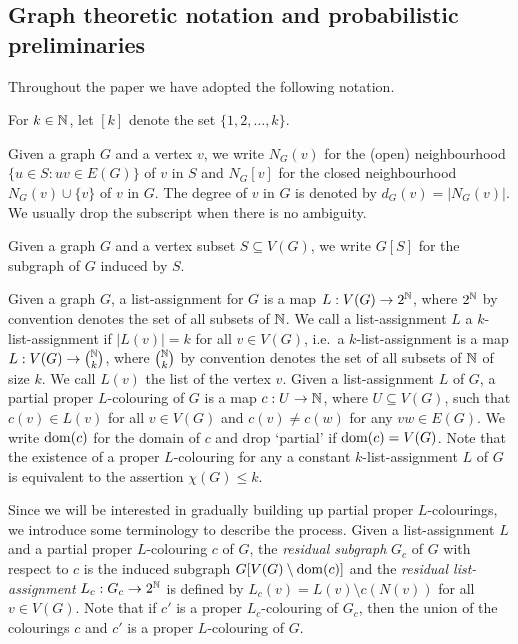 
\subsection{Graph theoretic notation and probabilistic preliminaries}
\label{sub:prelim}
\label{sub:notation}


Throughout the paper we have adopted the following notation. 

For $k\in \mathbb{N}$, let $[k]$ denote the set $\{1,2,\dots,k\}$.

Given a graph $G$ and a vertex $v$, we write $N_G(v)$ for the (open) neighbourhood $\{u\in S:uv\in E(G)\}$ of $v$ in $S$ and $N_G[v]$ for the closed neighbourhood $N_G(v)\cup \{v\}$ of $v$ in $G$. 
The degree of $v$ in $G$ is denoted by $d_G(v)=|N_G(v)|$.
We usually drop the subscript when there is no ambiguity.

Given a graph $G$ and a vertex subset $S\subseteq V(G)$, we write $G[S]$ for the subgraph of $G$ induced by $S$.

Given a graph $G$, a list-assignment for $G$ is a map $L:V(G)\to 2^{\mathbb{N}}$, where $2^{\mathbb{N}}$ by convention denotes the set of all subsets of $\mathbb{N}$. We call a list-assignment $L$ a $k$-list-assignment if $|L(v)|=k$ for all $v\in V(G)$, i.e.~a $k$-list-assignment is a map $L:V(G)\to \binom{\mathbb{N}}{k}$, where $\binom{\mathbb{N}}{k}$ by convention denotes the set of all subsets of $\mathbb{N}$ of size $k$.
We call $L(v)$ the list of the vertex $v$. 
Given a list-assignment $L$ of $G$, a partial proper $L$-colouring of $G$ is a map $c:U\to \mathbb{N}$, where $U\subseteq V(G)$, such that $c(v)\in L(v)$ for all $v\in V(G)$ and $c(v)\neq c(w)$ for any $vw\in E(G)$.
We write $\operatorname{dom}(c)$ for the domain of $c$ and drop `partial' if $\operatorname{dom}(c)=V(G)$.
Note that the existence of a proper $L$-colouring for any a constant $k$-list-assignment $L$ of $G$ is equivalent to the assertion $\chi(G) \le k$.

Since we will be interested in gradually building up partial proper $L$-colourings, we introduce some terminology to describe the process.
Given a list-assignment $L$ and a partial proper $L$-colouring $c$ of $G$, the {\em residual subgraph} $G_c$ of $G$ with respect to $c$ is the induced subgraph $G[V(G)\setminus \operatorname{dom}(c)]$ and the {\em residual list-assignment} $L_c:G_c\to 2^{\mathbb{N}}$ is defined by $L_c(v) = L(v)\setminus c(N(v))$ for all $v\in V(G)$.
Note that if $c'$ is a proper $L_c$-colouring of $G_c$, then the union of the colourings $c$ and $c'$ is a proper $L$-colouring of $G$.




